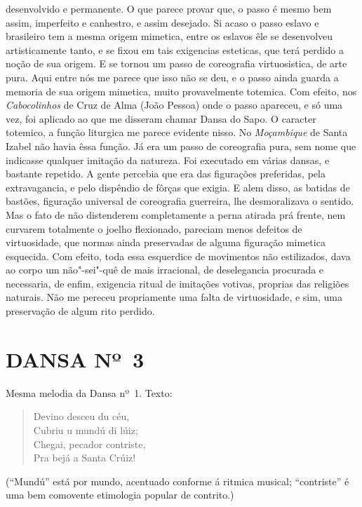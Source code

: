desenvolvido e permanente. O que parece provar que, o passo é mesmo bem
assim, imperfeito e canhestro, e assim desejado. Si acaso o passo eslavo
e brasileiro tem a mesma origem mimetica, entre os eslavos êle se
desenvolveu artisticamente tanto, e se fixou em tais exigencias
esteticas, que terá perdido a noção de sua origem. E se tornou um passo
de coreografia virtuosistica, de arte pura. Aqui entre nós me parece que
isso não se deu, e o passo ainda guarda a memoria de sua origem
mimetica, muito provavelmente totemica. Com efeito, nos
\emph{Cabocolinhos} de Cruz de Alma (João Pessoa) onde o passo apareceu,
e só uma vez, foi aplicado ao que me disseram chamar Dansa do Sapo. O
caracter totemico, a função liturgica me parece evidente nisso. No
\emph{Moçambique} de Santa Izabel não havia êssa função. Já era um passo
de coreografia pura, sem nome que indicasse qualquer imitação da
natureza. Foi executado em várias dansas, e bastante repetido. A gente
percebia que era das figurações preferidas, pela extravagancia, e pelo
dispêndio de fôrças que exigia. E alem disso, as batidas de bastões,
figuração universal de coreografia guerreira, lhe desmoralizava o
sentido. Mas o fato de não distenderem completamente a perna atirada prá
frente, nem curvarem totalmente o joelho flexionado, pareciam menos
defeitos de virtuosidade, que normas ainda preservadas de alguma
figuração mimetica esquecida. Com efeito, toda essa esquerdice de
movimentos não estilizados, dava ao corpo um não"-sei"-quê de mais
irracional, de deselegancia procurada e necessaria, de enfim, exigencia
ritual de imitações votivas, proprias das religiões naturais. Não me
pereceu propriamente uma falta de virtuosidade, e sim, uma preservação
de algum rito perdido.

\pagebreak

\section*{DANSA Nº~3}

Mesma melodia da Dansa nº~1. Texto:

\begin{verse}
Devino desceu du céu,\\
Cubriu u mundú di lúiz;\\
Chegai, pecador contriste,\\
Pra bejá a Santa Crúiz!
\end{verse}
(``Mundú'' está por mundo, acentuado conforme á ritmica musical;
``contriste'' é uma bem comovente etimologia popular de contrito.)

